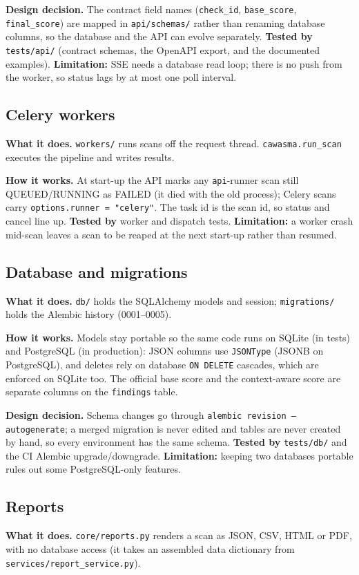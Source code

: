 \textbf{Design decision.} The contract field names
(\texttt{check\_id}, \texttt{base\_score}, \texttt{final\_score}) are mapped in
\texttt{api/schemas/} rather than renaming database columns, so the database and
the API can evolve separately. \textbf{Tested by} \texttt{tests/api/} (contract
schemas, the OpenAPI export, and the documented examples).
\textbf{Limitation:} SSE needs a database read loop; there is no push from the
worker, so status lags by at most one poll interval.

\subsection{Celery workers}
\textbf{What it does.} \texttt{workers/} runs scans off the request thread.
\texttt{cawasma.run\_scan} executes the pipeline and writes results.

\textbf{How it works.} At start-up the API marks any \texttt{api}-runner scan
still QUEUED/RUNNING as FAILED (it died with the old process); Celery scans carry
\texttt{options.runner = "celery"}. The task id is the scan id, so status and
cancel line up. \textbf{Tested by} worker and dispatch tests.
\textbf{Limitation:} a worker crash mid-scan leaves a scan to be reaped at the
next start-up rather than resumed.

\subsection{Database and migrations}
\textbf{What it does.} \texttt{db/} holds the SQLAlchemy models and session;
\texttt{migrations/} holds the Alembic history (0001--0005).

\textbf{How it works.} Models stay portable so the same code runs on SQLite (in
tests) and PostgreSQL (in production): JSON columns use \texttt{JSONType} (JSONB
on PostgreSQL), and deletes rely on database \texttt{ON DELETE} cascades, which
are enforced on SQLite too. The official base score and the context-aware score
are separate columns on the \texttt{findings} table.

\textbf{Design decision.} Schema changes go through \texttt{alembic
revision --autogenerate}; a merged migration is never edited and tables are never
created by hand, so every environment has the same schema. \textbf{Tested by}
\texttt{tests/db/} and the CI Alembic upgrade/downgrade. \textbf{Limitation:}
keeping two databases portable rules out some PostgreSQL-only features.

\subsection{Reports}
\textbf{What it does.} \texttt{core/reports.py} renders a scan as JSON, CSV, HTML
or PDF, with no database access (it takes an assembled data dictionary from
\texttt{services/report\_service.py}).

